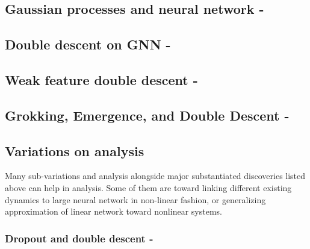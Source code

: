\documentclass[10pt]{article} %
\begin{document}
\clearpage

\subsection{Gaussian processes and neural network - \cite{harzli2023doubledescentcurvesneuralnetworks}}

\clearpage

\subsection{Double descent on GNN - \cite{shi2024homophilymodulatesdoubledescent}}

\clearpage

\subsection{Weak feature double descent - \cite{Belkin_2020}}

\clearpage

\subsection{Grokking, Emergence, and Double Descent - ~\cite{huang2025samplecomplexityrepresentationability}}

\clearpage

\subsection{Variations on analysis}
Many sub-variations and analysis alongside major substantiated discoveries listed above can help in analysis. Some of them are toward linking different existing dynamics to large neural network in non-linear fashion, or generalizing approximation of linear network toward nonlinear systems. 
\subsubsection{Dropout and double descent - \cite{Yang_2024}}
\end{document}
